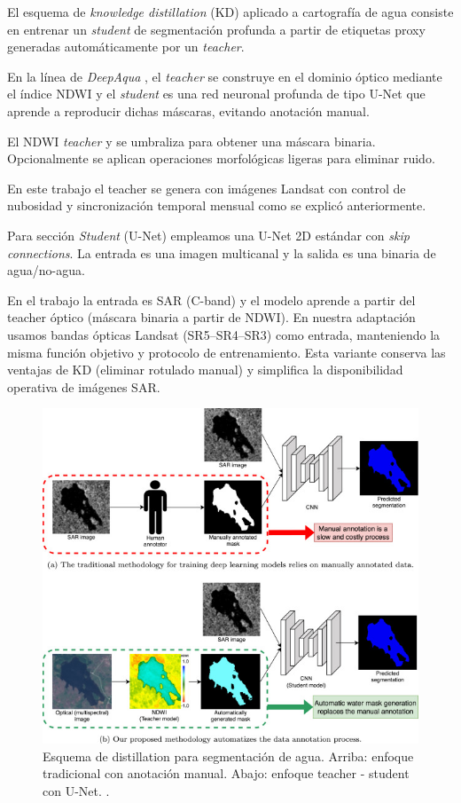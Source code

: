 El esquema de \textit{knowledge distillation} (KD) aplicado a cartografía de agua consiste en entrenar un \textit{student} de segmentación profunda a partir de etiquetas proxy generadas automáticamente por un \textit{teacher}. 

En la línea de \emph{DeepAqua} \cite{DeepAqua2023}, el \textit{teacher} se construye en el dominio óptico mediante el índice NDWI y el \textit{student} es una red neuronal profunda de tipo U-Net que aprende a reproducir dichas máscaras, evitando anotación manual.

El NDWI \textit{teacher} y se umbraliza para obtener una máscara binaria. Opcionalmente se aplican operaciones morfológicas ligeras para eliminar ruido. 

En este trabajo el teacher se genera con imágenes Landsat con control de nubosidad y sincronización temporal mensual como se explicó anteriormente.

Para sección \textit{Student} (U-Net) empleamos una U-Net 2D estándar con \emph{skip connections}. La entrada es una imagen multicanal y la salida es una binaria de agua/no-agua. 

En el trabajo \cite{DeepAqua2023} la entrada es SAR (C-band) y el modelo aprende a partir del teacher óptico (máscara binaria a partir de NDWI). En nuestra adaptación usamos bandas ópticas Landsat (SR5--SR4--SR3) como entrada, manteniendo la misma función objetivo y protocolo de entrenamiento. Esta variante conserva las ventajas de KD (eliminar rotulado manual) y simplifica la disponibilidad operativa de imágenes SAR.

\begin{figure}[t]
  \centering
  \includegraphics[scale=0.7]{Figures/KD_deepaqua.jpg}
  \caption{Esquema de distillation para segmentación de agua. Arriba: enfoque tradicional con anotación manual. Abajo: enfoque teacher - student con U-Net. \protect\footnotemark.}
  \label{fig:kd-water}
\end{figure}
\FloatBarrier 

